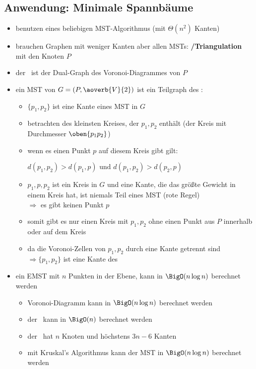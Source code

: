 \subsection{Anwendung: Minimale Spannbäume}
\begin{itemize}
	\item benutzen eines beliebigen MST-Algorithmus (mit $\Theta(n^2)$ Kanten)
	\vspace*{-.5\baselineskip}\item brauchen Graphen mit weniger Kanten aber allen MSTs: \textbf{\dg/Triangulation} mit den Knoten $P$
	\vspace*{-.5\baselineskip}\item der \dg~ist der Dual-Graph des Voronoi-Diagrammes von $P$
	\vspace*{-.5\baselineskip}\item ein MST von $G=\left(P, \aoverb{V}{2}\right)$ ist ein Teilgraph des \dg:\vspace*{-1.5\baselineskip}
		\Proof\vspace*{-.5\baselineskip}
			\begin{itemize}
				\item $\{p_1,p_2\}$ ist eine Kante eines MST in $G$
				\item betrachten des kleinsten Kreises, der $p_1,p_2$ enthält (der Kreis mit Durchmesser $\oben{p_1p_2}$)
				\item wenn es einen Punkt $p$ auf diesem Kreis gibt gilt:
				\begin{center}
					$d(p_1,p_2)>d(p_1,p)\text{ und } d(p_1,p_2)>d(p_2,p)$
				\end{center}
				\item $p_1,p,p_2$ ist ein Kreis in $G$ und eine Kante, die das größte Gewicht in einem Kreis hat, ist niemals Teil eines MST (rote Regel)\\
				$\Rightarrow$ es gibt keinen Punkt $p$
				\item somit gibt es nur einen Kreis mit $p_1,p_2$ ohne einen Punkt aus $P$ innerhalb oder auf dem Kreis
				\item da die Voronoi-Zellen von $p_1,p_2$ durch eine Kante getrennt sind\\
				$\Rightarrow \{p_1,p_2\}$ ist eine Kante des \dg
			\end{itemize}
	\vspace*{-.5\baselineskip}\item ein EMST mit $n$ Punkten in der Ebene, kann in $\BigO(n\log n)$ berechnet werden\up
		\Proof\vspace*{-.5\baselineskip}
			\begin{itemize}
				\item Voronoi-Diagramm kann in $\BigO(n\log n)$ berechnet werden
				\item der \dg~kann in $\BigO(n)$ berechnet werden
				\item der \dg~hat $n$ Knoten und höchstens $3n-6$ Kanten
				\item mit Kruskal's Algorithmus kann der MST in $\BigO(n\log n)$ berechnet werden
			\end{itemize}
\end{itemize}